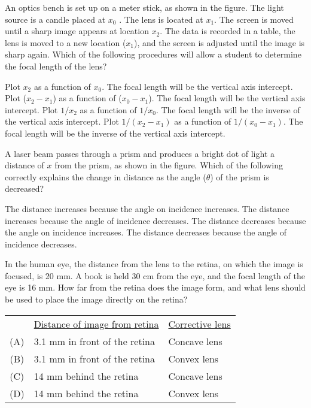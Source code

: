 \documentclass{../../../oss-ap12ibhl}
\begin{document}
\begin{questions}
  \question An optics bench is set up on a meter stick, as shown in the figure.
  The light source is a candle placed at $x_0$ . The lens is located at $x_1$.
  The screen is moved until a sharp image appears at location $x_2$. The data is
  recorded in a table, the lens is moved to a new location ($x_1$), and the
  screen is adjusted until the image is sharp again. Which of the following
  procedures will allow a student to determine the focal length of the lens?
  \begin{choices}
    \choice Plot $x_2$ as a function of $x_0$. The focal length will be the
    vertical axis intercept.
    \choice Plot ($x_2-x_1$) as a function of ($x_0-x_1$). The focal length will
    be the vertical axis intercept.
    \choice Plot $1/x_2$ as a function of $1/x_0$. The focal length will be the
    inverse of the vertical axis intercept.
    \choice Plot $1/(x_2-x_1)$ as a function of $1/(x_0-x_1)$. The focal length
    will be the inverse of the vertical axis intercept.
  \end{choices}

  \question A laser beam passes through a prism and produces a bright dot of
  light a distance of $x$ from the prism, as shown in the figure. Which of the
  following correctly explains the change in distance as the angle
  ($\theta$) of the prism is decreased?
  \begin{choices}
    \choice The distance increases because the angle on incidence increases.
    \choice The distance increases because the angle of incidence decreases.
    \choice The distance decreases because the angle on incidence increases.
    \choice The distance decreases because the angle of incidence decreases.
  \end{choices}

  \question In the human eye, the distance from the lens to the retina, on
  which the image is focused, is 20 mm. A book is held 30 cm from the eye, and
  the focal length of the eye is 16 mm. How far from the retina does the
  image form, and what lens should be used to place the image directly
  on the retina?
   
  \begin{tabular}{cll}
    & \underline{Distance of image from retina}
    & \underline{Corrective lens} \\
    (A) & 3.1 mm in front of the retina & Concave lens \\
    (B) & 3.1 mm in front of the retina & Convex lens \\
    (C) & 14 mm behind the retina & Concave lens \\
    (D) & 14 mm behind the retina & Convex lens
  \end{tabular}
  \newpage
  

\end{questions}
\end{document}
